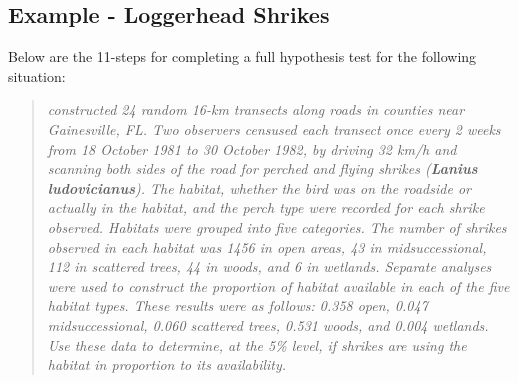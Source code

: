 \documentclass[10pt,openany]{book}\usepackage[]{graphicx}\usepackage[]{color}
\begin{document}
\subsection{Example - Loggerhead Shrikes}
Below are the 11-steps  for completing a full hypothesis test for the following situation:
\vspace{-4pt}
\begin{quote}
\textsl{\cite{BohallWood1987} constructed 24 random 16-km transects along roads in counties near Gainesville, FL. Two observers censused each transect once every 2 weeks from 18 October 1981 to 30 October 1982, by driving 32 km/h and scanning both sides of the road for perched and flying shrikes (\textbf{Lanius ludovicianus}). The habitat, whether the bird was on the roadside or actually in the habitat, and the perch type were recorded for each shrike observed. Habitats were grouped into five categories. The number of shrikes observed in each habitat was 1456 in open areas, 43 in midsuccessional, 112 in scattered trees, 44 in woods, and 6 in wetlands. Separate analyses were used to construct the proportion of habitat available in each of the five habitat types. These results were as follows: 0.358 open, 0.047 midsuccessional, 0.060 scattered trees, 0.531 woods, and 0.004 wetlands. Use these data to determine, at the 5\% level, if shrikes are using the habitat in proportion to its availability.}
\end{quote}
\end{document}
